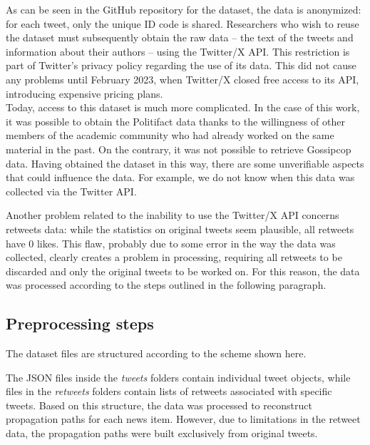 \documentclass[a4paper,twoside,12pt]{book}
\begin{document}
As can be seen in the GitHub repository for the dataset, the data is anonymized: for each tweet, only the unique ID code is shared. Researchers who wish to reuse the dataset must subsequently obtain the raw data -- the text of the tweets and information about their authors -- using the Twitter/X API. This restriction is part of Twitter's privacy policy regarding the use of its data. This did not cause any problems until February 2023, when Twitter/X closed free access to its API, introducing expensive pricing plans. \\
Today, access to this dataset is much more complicated. In the case of this work, it was possible to obtain the Politifact data thanks to the willingness of other members of the academic community who had already worked on the same material in the past. On the contrary, it was not possible to retrieve Gossipcop data. Having obtained the dataset in this way, there are some unverifiable aspects that could influence the data. For example, we do not know when this data was collected via the Twitter API. 

Another problem related to the inability to use the Twitter/X API concerns retweets data: while the statistics on original tweets seem plausible, all retweets have 0 likes. This flaw, probably due to some error in the way the data was collected, clearly creates a problem in processing, requiring all retweets to be discarded and only the original tweets to be worked on. For this reason, the data was processed according to the steps outlined in the following paragraph.
\clearpage

\subsection*{Preprocessing steps}
The dataset files are structured according to the scheme shown here.
\vspace{2em}
\vspace{2em}

The JSON files inside the \textit{tweets} folders contain individual tweet objects, while files in the \textit{retweets} folders contain lists of retweets associated with specific tweets. Based on this structure, the data was processed to reconstruct propagation paths for each news item. However, due to limitations in the retweet data, the propagation paths were built exclusively from original tweets.
\end{document}

